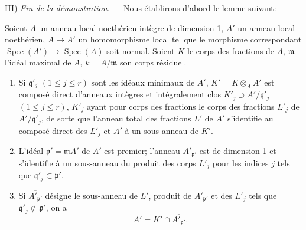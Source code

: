 III) \emph{Fin de la démonstration.} --- Nous établirons d'abord le lemme
suivant:

\begin{lemma}[6.14.1.2]
\label{IV.2.s6.14.1.2-fr}
Soient $A$ un anneau local noethérien intègre de dimension 1, $A'$ un
anneau local noethérien, $A\to A'$ un homomorphisme local tel que le
morphisme correspondant $\operatorname{Spec}(A')\to\operatorname{Spec}(A)$
soit normal. Soient $K$ le corps des fractions de $A$, $\mathfrak m$
l'idéal maximal de $A$, $k=A/\mathfrak m$ son corps résiduel.
\begin{enumerate}
\item[(i)] Si $\mathfrak q'_j$ $(1\leqslant j\leqslant r)$ sont les idéaux
minimaux de $A'$, $K'=K\otimes_A A'$ est composé direct d'anneaux intègres
et intégralement clos $K'_j\supset A'/\mathfrak q'_j$
$(1\leqslant j\leqslant r)$, $K'_j$ ayant pour corps des fractions le corps
des fractions $L'_j$ de $A'/\mathfrak q'_j$, de sorte que l'anneau total des
fractions $L'$ de $A'$ s'identifie au composé direct des $L'_j$ et $A'$ à
un sous-anneau de $K'$.
\item[(ii)] L'idéal $\mathfrak p'=\mathfrak mA'$ de $A'$ est premier;
l'anneau $A'_{\mathfrak p'}$ est de dimension 1 et s'identifie à un
sous-anneau du produit des corps $L'_j$ pour les indices $j$ tels que
$\mathfrak q'_j\subset\mathfrak p'$.
\item[(iii)] Si $\overline{A'_{\mathfrak p'}}$ désigne le sous-anneau de
$L'$, produit de $A'_{\mathfrak p'}$ et des $L'_j$ tels que
$\mathfrak q'_j\not\subset\mathfrak p'$, on a
\begin{equation}
\tag{6.14.1.3}
\label{IV.2.s6.14.1.3-fr}
A'=K'\cap\overline{A'_{\mathfrak p'}}.
\end{equation}
\end{enumerate}
\end{lemma}

